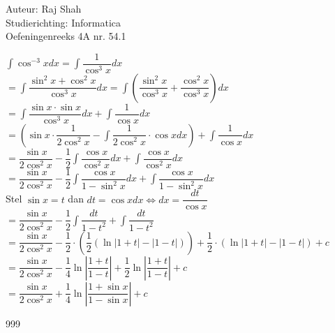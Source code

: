 \documentclass[a4paper]{article}
\begin{document}
  
\noindent \large Auteur: Raj Shah \\
\noindent \large Studierichting: Informatica\\
\noindent \large Oefeningenreeks 4A nr. 54.1\\

\medskip

\normalsize

$\displaystyle\int \cos^{-3} x dx = \displaystyle\int \dfrac{1}{\cos^3 x}dx$\\

$ = \displaystyle\int \dfrac{\sin^2 x + \cos^2 x}{\cos^3 x} dx = \displaystyle\int \left(\dfrac{\sin^2 x}{\cos^3 x} + \dfrac{\cos^2 x}{\cos^3 x}\right) dx$\\

$ = \displaystyle\int \dfrac{\sin x \cdot \sin x}{\cos^3 x}dx + \displaystyle\int \dfrac{1}{\cos x}dx$\\

$ = \left(\sin x \cdot \dfrac{1}{2 \cos^2 x} - \displaystyle\int \dfrac{1}{2\cos^2 x} \cdot \cos x dx\right) + \displaystyle\int \dfrac{1}{\cos x}dx$\\

$ = \dfrac{\sin x}{2\cos^2 x} - \dfrac{1}{2} \displaystyle\int \dfrac{\cos x}{\cos^2 x}dx + \displaystyle\int \dfrac{\cos x}{\cos^2 x} dx$\\

$ = \dfrac{\sin x}{2\cos^2 x} - \dfrac{1}{2} \displaystyle\int \dfrac{\cos x}{1 - \sin^2 x}dx + \displaystyle\int \dfrac{\cos x}{1 - \sin^2 x}dx$\\

Stel $\sin x = t$ dan $dt = \cos x dx \Leftrightarrow dx = \dfrac{dt}{\cos x}$\\

$ = \dfrac{\sin x}{2\cos^2 x}- \dfrac{1}{2} \displaystyle\int \dfrac{dt}{1-t^2} +  \displaystyle\int \dfrac{dt}{1-t^2}$\\

$ = \dfrac{\sin x}{2\cos^2 x} - \dfrac{1}{2}  \cdot \left(\dfrac{1}{2} \left(\ln |1 + t| - |1 - t| \right)\right) + \dfrac{1}{2} \cdot (\ln |1+t| - |1-t |) + c$\\

$ = \dfrac{\sin x}{2\cos^2 x} -\dfrac{1}{4} \ln \left|\dfrac{1+t}{1-t}\right| + \dfrac{1}{2} \ln \left|\dfrac{1+t}{1-t}\right| + c$\\

$ = \dfrac{\sin x}{2\cos^2 x} + \dfrac{1}{4}\ln \left|\dfrac{1+\sin x}{1-\sin x}\right| + c$









\begin{thebibliography}{999}
\end{thebibliography}
\end{document}
